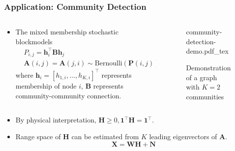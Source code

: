 \documentclass[10pt,xcolor={usenames,dvipsnames,table}]{beamer}
\def\blue{\color{blue}}
\newcommand{\T}{\!\top\!}
\newcommand{\incfig}[2][1]{%
    \def\svgwidth{#1\columnwidth}
    {#2.pdf_tex}
}
\newcommand{\citep}[1]{{\blue \scriptsize \parencite{#1}}}
\begin{document}
\begin{frame}
    \frametitle{Application: Community Detection}
    \begin{columns}
        \begin{column}{0.7\textwidth}
    \begin{itemize}
        \item The mixed membership stochastic blockmodels \citep{airoldi2008mixed}
    \begin{align*}
    &P_{i,j} = \bm{h}_i^{\T} \bm{B} \bm{h}_j \\
    & \bm{A}(i,j) = \bm{A}(j, i) \sim \text{Bernoulli}(\bm{P}(i, j))
    \end{align*} 
    where $\bm{h}_i= [h_{1,i}, \ldots , h_{K, i}]^{\T}$ represents membership of node $i$, $\bm{B}$ represents community-community connection.
    \end{itemize}
        \end{column}
        \begin{column}{0.3\textwidth}
        \begin{figure}
            \centering
    \resizebox{\textwidth}{!}
            { 
            \incfig{community-detection-demo} }
            \caption*{Demonstration of a graph with $K=2$ communities}
        \end{figure}
        \end{column}
    \end{columns}

    \begin{columns}
        \begin{column}{1.\textwidth}
    \begin{itemize}
    \item By physical interpretation, $\bm{H} \geq 0, \bm{1}^{\T}\bm{H}=\bm{1}^{\T}$.
    \item Range space of $\bm{H}$ can be estimated from $K$ leading eigenvectors of $\bm{A}$.
        \citep{mao2017mixed,mao2017estimating,panov2018consistent,lei2015consistency}  
        \[
        \bm{X} = \bm{W} \bm{H} + \bm{N}
        \] 
    \end{itemize}
        \end{column}
    \end{columns}
\end{frame}
\end{document}
